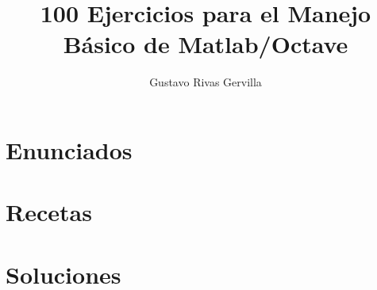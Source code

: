 \documentclass[]{book}
\title{100 Ejercicios para el Manejo Básico de Matlab/Octave}
\author{Gustavo Rivas Gervilla}
\begin{document}
\maketitle

\chapter{Enunciados} \def\capitulo{enunciados}



\chapter{Recetas} \def\capitulo{recetas}



\chapter{Soluciones} \def\capitulo{soluciones}


\end{document}
